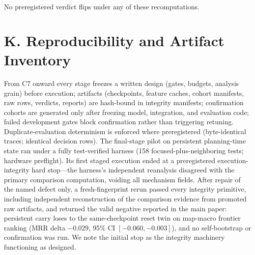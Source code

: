 \documentclass[letterpaper]{article} %
\newcommand{\stage}[1]{\textsc{#1}}
\begin{document}
No preregistered verdict flips under any of these recomputations.

\section{K. Reproducibility and Artifact Inventory}

From \stage{C7} onward every stage freezes a written design (gates, budgets, analysis grain) before execution; artifacts (checkpoints, feature caches, cohort manifests, raw rows, verdicts, reports) are hash-bound in integrity manifests; confirmation cohorts are generated only after freezing model, integration, and evaluation code; failed development gates block confirmation rather than triggering retuning. Duplicate-evaluation determinism is enforced where preregistered (byte-identical traces; identical decision rows). The final-stage pilot on persistent planning-time state ran under a fully test-verified harness (158 focused-plus-neighboring tests; hardware preflight). Its first staged execution ended at a preregistered execution-integrity hard stop---the harness's independent reanalysis disagreed with the primary comparison computation, voiding all mechanism fields. After repair of the named defect only, a fresh-fingerprint rerun passed every integrity primitive, including independent reconstruction of the comparison evidence from promoted raw artifacts, and returned the valid negative reported in the main paper: persistent carry loses to the same-checkpoint reset twin on map-macro frontier ranking (MRR delta $-0.029$, 95\% CI $[-0.060,-0.003]$), and no self-bootstrap or confirmation was run. We note the initial stop as the integrity machinery functioning as designed.
\end{document}
